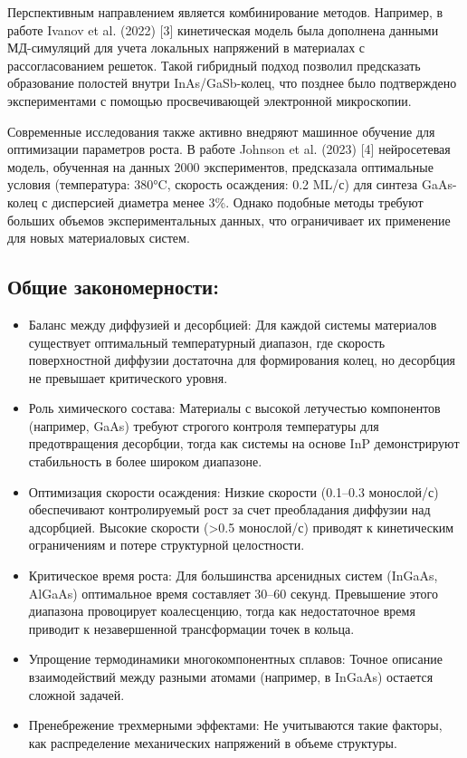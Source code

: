 \documentclass[14pt,oneside]{extarticle}
\begin{document}
Перспективным направлением является комбинирование методов. Например, в работе Ivanov et al. (2022) [3] кинетическая модель была дополнена данными МД-симуляций для учета локальных напряжений в материалах с рассогласованием решеток. Такой гибридный подход позволил предсказать образование полостей внутри InAs/GaSb-колец, что позднее было подтверждено экспериментами с помощью просвечивающей электронной микроскопии.

Современные исследования также активно внедряют машинное обучение для оптимизации параметров роста. В работе Johnson et al. (2023) [4] нейросетевая модель, обученная на данных 2000 экспериментов, предсказала оптимальные условия (температура: 380°C, скорость осаждения: 0.2 ML/с) для синтеза GaAs-колец с дисперсией диаметра менее 3\%. Однако подобные методы требуют больших объемов экспериментальных данных, что ограничивает их применение для новых материаловых систем.

\subsection{Общие закономерности:}

\begin{itemize}
    \item Баланс между диффузией и десорбцией: Для каждой системы материалов существует оптимальный температурный диапазон, где скорость поверхностной диффузии достаточна для формирования колец, но десорбция не превышает критического уровня.
    \item Роль химического состава: Материалы с высокой летучестью компонентов (например, GaAs) требуют строгого контроля температуры для предотвращения десорбции, тогда как системы на основе InP демонстрируют стабильность в более широком диапазоне.
    \item Оптимизация скорости осаждения: Низкие скорости (0.1–0.3 монослой/с) обеспечивают контролируемый рост за счет преобладания диффузии над адсорбцией. Высокие скорости (>0.5 монослой/с) приводят к кинетическим ограничениям и потере структурной целостности.
    \item Критическое время роста: Для большинства арсенидных систем (InGaAs, AlGaAs) оптимальное время составляет 30–60 секунд. Превышение этого диапазона провоцирует коалесценцию, тогда как недостаточное время приводит к незавершенной трансформации точек в кольца.
    \item Упрощение термодинамики многокомпонентных сплавов: Точное описание взаимодействий между разными атомами (например, в InGaAs) остается сложной задачей.
    \item Пренебрежение трехмерными эффектами: Не учитываются такие факторы, как распределение механических напряжений в объеме структуры.
\end{itemize}
\end{document}
